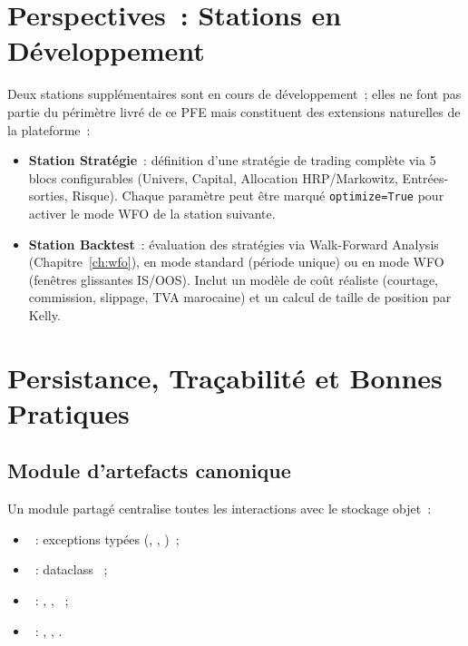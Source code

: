 \section{Perspectives~: Stations en Développement}
\label{sec:stations_perspectives}

Deux stations supplémentaires sont en cours de développement~; elles ne font pas
partie du périmètre livré de ce PFE mais constituent des extensions naturelles
de la plateforme~:

\begin{itemize}
    \item \textbf{Station Stratégie}~: définition d'une stratégie de trading complète
    via 5 blocs configurables (Univers, Capital, Allocation HRP/Markowitz, Entrées-sorties,
    Risque). Chaque paramètre peut être marqué \texttt{optimize=True} pour activer
    le mode WFO de la station suivante.
    \item \textbf{Station Backtest}~: évaluation des stratégies via Walk-Forward
    Analysis (Chapitre~\ref{ch:wfo}), en mode standard (période unique) ou en
    mode WFO (fenêtres glissantes IS/OOS). Inclut un modèle de coût réaliste
    (courtage, commission, slippage, TVA marocaine) et un calcul de taille de
    position par Kelly.
\end{itemize}

\section{Persistance, Traçabilité et Bonnes Pratiques}
\label{sec:persistance}

\subsection{Module d'artefacts canonique}

Un module partagé  centralise toutes les
interactions avec le stockage objet~:

\begin{itemize}
    \item {}~: exceptions typées (,
    , )~;
    \item {}~: dataclass ~;
    \item {}~: , ,
    ~;
    \item {}~: , ,
    .
\end{itemize}

